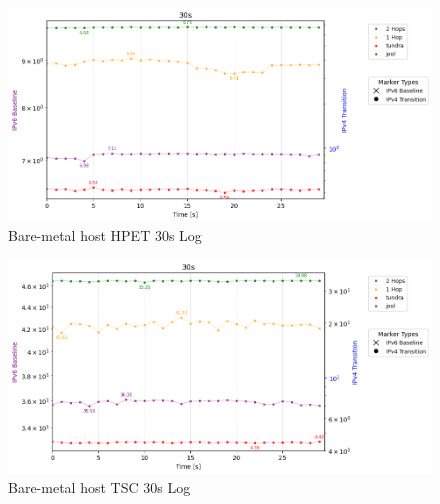 \begin{figure}[H]
    \centering
    \includegraphics[width=1\textwidth]{resources/finalPlots/appendix/jitter/LocalSingle_tcp_dualAxis_hpet_30s_log.png}
    \caption{Bare-metal host HPET 30s Log}
    \label{fig:local_single_tcp_jitter_hpet_30s_log}
\end{figure}



\begin{figure}[H]
    \centering
    \includegraphics[width=1\textwidth]{resources/finalPlots/appendix/jitter/LocalSingle_tcp_dualAxis_tsc_30s_log.png}
    \caption{Bare-metal host TSC 30s Log}
    \label{fig:local_single_tcp_jitter_tsc_30s_log}
\end{figure}


\newpage


\listoffigures
\newpage